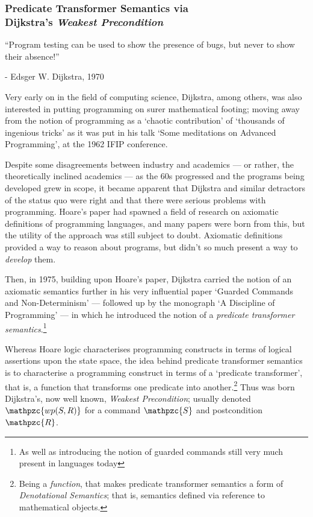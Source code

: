 \documentclass[oneside,12pt]{article}
\newcommand{\textM}[1]{\ensuremath{\mathpzc{#1}}}
\begin{document}
\subsubsection{Predicate Transformer Semantics via \\ Dijkstra's \emph{Weakest Precondition}}

\epigraph{``Program testing can be used to show the presence of bugs, but never to show their absence!''}{ \scriptsize - Edsger W. Dijkstra, 1970 }

Very early on in the field of computing science, Dijkstra, among others, was also interested in putting programming on surer mathematical footing; moving away from the notion of programming as a `chaotic contribution' of `thousands of ingenious tricks' as it was put in his talk `Some meditations on Advanced Programming'\cite{Dijkstra62}, at the 1962 IFIP conference.

Despite some disagreements between industry and academics --- or rather, the theoretically inclined academics --- as the 60s progressed and the programs being developed grew in scope, it became apparent that Dijkstra and similar detractors of the status quo were right and that there were serious problems with programming. Hoare's paper had spawned a field of research on axiomatic definitions of programming languages, and many papers were born from this, but the utility of the approach was still subject to doubt. Axiomatic definitions provided a way to reason about programs, but didn't so much present a way to \emph{develop} them.

Then, in 1975, building upon Hoare's paper, Dijkstra carried the notion of an axiomatic semantics further in his very influential paper `Guarded Commands and Non-Determinism'\cite{Dijkstra75} --- followed up by the monograph `A Discipline of Programming'\cite{Dijkstra76} --- in which he introduced the notion of a \emph{predicate transformer semantics}.\footnote{As well as introducing the notion of guarded commands still very much present in languages today}



Whereas Hoare logic characterises programming constructs in terms of logical assertions upon the state space, the idea behind predicate transformer semantics is to characterise a programming construct in terms of a `predicate transformer', that is, a function that transforms one predicate into another.\footnote{Being a \emph{function}, that makes predicate transformer semantics a form of \emph{Denotational Semantics}; that is, semantics defined via reference to mathematical objects.} Thus was born Dijkstra's, now well known, \emph{Weakest Precondition}; usually denoted \textM{wp(S,R)} for a command \textM{S} and postcondition \textM{R}.
\end{document}
